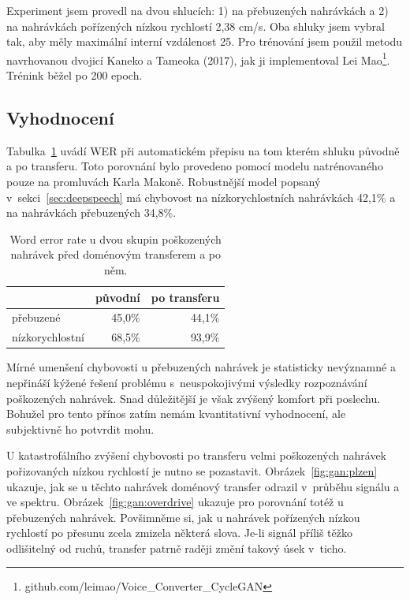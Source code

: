 Experiment jsem provedl na dvou shlucích: 1) na přebuzených nahrávkách a 2) na
nahrávkách pořízených nízkou rychlostí 2,38 cm/s. Oba shluky jsem vybral tak, aby
měly maximální interní vzdálenost 25. Pro trénování jsem použil metodu
navrhovanou dvojicí Kaneko a Tameoka (2017)\cite{kaneko2017parallel}, jak ji
implementoval Lei Mao\footnote{github.com/leimao/Voice\_Converter\_CycleGAN}.
Trénink běžel po 200 epoch.

\subsection{Vyhodnocení}
\label{sec:akustika:vyhodnoceni}

Tabulka~\ref{tab:ganeval} uvádí WER při automatickém přepisu na tom kterém
shluku původně a po transferu. Toto porovnání bylo provedeno pomocí modelu
natrénovaného pouze na promluvách Karla Makoně. Robustnější model popsaný
v~sekci~\ref{sec:deepspeech} má chybovost na nízkorychlostních nahrávkách
42,1\% %
a na nahrávkách přebuzených 34,8\%. %

\begin{table}[htpb]
\begin{center}
\begin{tabular}{|l||r|r|}
\hline
                 & původní & po transferu \\
\hline
přebuzené        & 45,0\%  & 44,1\% \\
nízkorychlostní  & 68,5\%  & 93,9\% \\
\hline
\end{tabular}
\caption{Word error rate u dvou skupin poškozených nahrávek před doménovým
transferem a po něm.}\label{tab:ganeval}
\end{center}
\end{table}

Mírné umenšení chybovosti u přebuzených nahrávek je statisticky nevýznamné a
nepřináší kýžené řešení problému s~neuspokojivými výsledky rozpoznávání
poškozených nahrávek. Snad důležitější je však zvýšený komfort při
poslechu. Bohužel pro tento přínos zatím nemám kvantitativní vyhodnocení, ale
subjektivně ho potvrdit mohu.

U katastrofálního zvýšení chybovosti po transferu velmi poškozených nahrávek
pořizovaných nízkou rychlostí je nutno se pozastavit.
Obrázek~\ref{fig:gan:plzen} ukazuje, jak se u těchto nahrávek doménový transfer
odrazil v~průběhu signálu a ve spektru. Obrázek~\ref{fig:gan:overdrive} ukazuje
pro porovnání totéž u přebuzených nahrávek. Povšimněme si, jak u nahrávek
pořízených nízkou rychlostí po přesunu zcela zmizela některá slova. Je-li signál
příliš těžko odlišitelný od ruchů, transfer patrně raději změní takový úsek
v~ticho.

